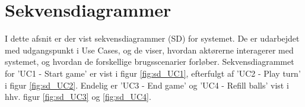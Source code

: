 \documentclass[Arkitektur/System_main.tex]{subfiles}
\begin{document}
\section{Sekvensdiagrammer}

I dette afsnit er der vist sekvensdiagrammer (SD) for systemet. De er udarbejdet med udgangspunkt i Use Cases, og de viser, hvordan aktørerne interagerer med systemet, og hvordan de forskellige brugsscenarier forløber. Sekvensdiagrammet for 'UC1 - Start game' er vist i figur \ref{fig:sd_UC1}, efterfulgt af 'UC2 - Play turn' i figur \ref{fig:sd_UC2}. Endelig er 'UC3 - End game' og 'UC4 - Refill balls' vist i hhv. figur \ref{fig:sd_UC3} og \ref{fig:sd_UC4}. 




\end{document}
